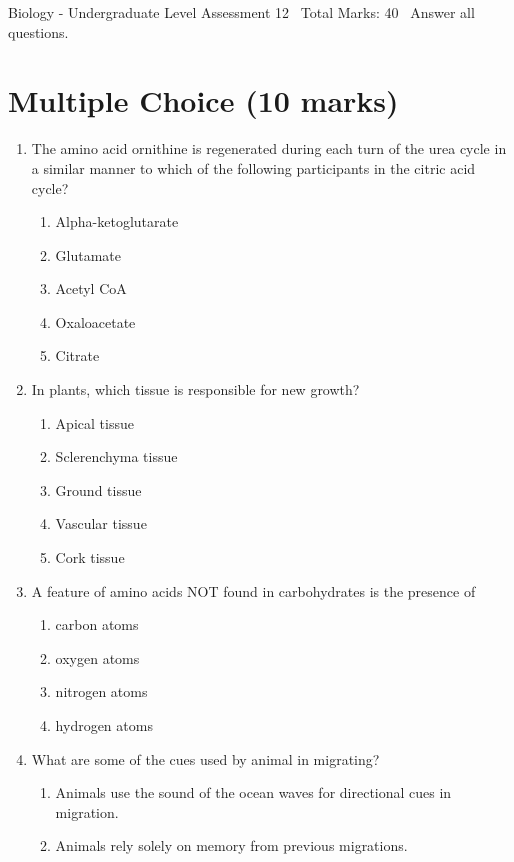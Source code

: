 \documentclass[12pt]{article}
\begin{document}
\begin{center}
Biology - Undergraduate Level Assessment 12 \
Total Marks: 40 \
Answer all questions.
\end{center}

\section*{Multiple Choice (10 marks)}
\begin{enumerate}[label=\arabic*.]
\item The amino acid ornithine is regenerated during each turn of the urea cycle in a similar manner to which of the following participants in the citric acid cycle?
\begin{enumerate}[label=(\alph*)]
    \item Alpha-ketoglutarate
    \item Glutamate
    \item Acetyl CoA
    \item Oxaloacetate
    \item Citrate
\end{enumerate}
\item In plants, which tissue is responsible for new growth?
\begin{enumerate}[label=(\alph*)]
    \item Apical tissue
    \item Sclerenchyma tissue
    \item Ground tissue
    \item Vascular tissue
    \item Cork tissue
\end{enumerate}
\item A feature of amino acids NOT found in carbohydrates is the presence of
\begin{enumerate}[label=(\alph*)]
    \item carbon atoms
    \item oxygen atoms
    \item nitrogen atoms
    \item hydrogen atoms
\end{enumerate}
\item What are some of the cues used by animal in migrating?
\begin{enumerate}[label=(\alph*)]
    \item Animals use the sound of the ocean waves for directional cues in migration.
    \item Animals rely solely on memory from previous migrations.

\end{enumerate}
\end{enumerate}
\end{document}
